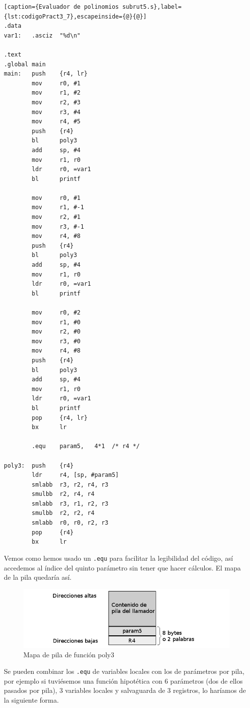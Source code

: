 \begin{lstlisting}[caption={Evaluador de polinomios subrut5.s},label={lst:codigoPract3_7},escapeinside={@}{@}]
.data
var1:   .asciz  "%d\n"

.text
.global main
main:   push    {r4, lr}
        mov     r0, #1
        mov     r1, #2
        mov     r2, #3
        mov     r3, #4
        mov     r4, #5
        push    {r4}
        bl      poly3
        add     sp, #4
        mov     r1, r0
        ldr     r0, =var1
        bl      printf

        mov     r0, #1
        mov     r1, #-1
        mov     r2, #1
        mov     r3, #-1
        mov     r4, #8
        push    {r4}
        bl      poly3
        add     sp, #4
        mov     r1, r0
        ldr     r0, =var1
        bl      printf

        mov     r0, #2
        mov     r1, #0
        mov     r2, #0
        mov     r3, #0
        mov     r4, #8
        push    {r4}
        bl      poly3
        add     sp, #4
        mov     r1, r0
        ldr     r0, =var1
        bl      printf
        pop     {r4, lr}
        bx      lr

        .equ    param5,   4*1  /* r4 */

poly3:  push    {r4}
        ldr     r4, [sp, #param5]
        smlabb  r3, r2, r4, r3
        smulbb  r2, r4, r4
        smlabb  r3, r1, r2, r3
        smulbb  r2, r2, r4
        smlabb  r0, r0, r2, r3
        pop     {r4}
        bx      lr
\end{lstlisting}

Vemos como hemos usado un {\tt .equ} para facilitar la legibilidad del código, así
accedemos al índice del quinto parámetro sin tener que hacer cálculos. El mapa de la
pila quedaría así.

\begin{figure}[h]
  \centering
    \includegraphics[width=14cm]{graphs/pila3.png}
  \caption{Mapa de pila de función poly3}
  \label{fig:pila3}
\end{figure}

Se pueden combinar los {\tt .equ} de variables locales con los de parámetros por pila,
por ejemplo si tuviésemos una función hipotética con 6 parámetros (dos de ellos pasados
por pila), 3 variables locales y salvaguarda de 3 registros, lo haríamos de la
siguiente forma.

